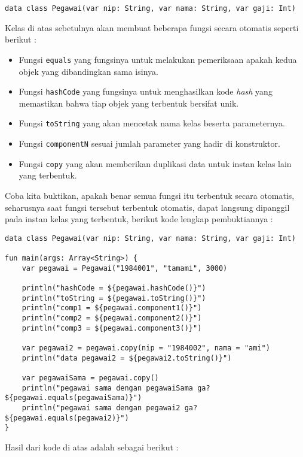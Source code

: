 \begin{lstlisting}
data class Pegawai(var nip: String, var nama: String, var gaji: Int)
\end{lstlisting}

Kelas di atas sebetulnya akan membuat beberapa fungsi secara otomatis seperti berikut :

\begin{itemize}
	\item Fungsi \texttt{equals} yang fungsinya untuk melakukan pemeriksaan apakah kedua objek yang dibandingkan sama isinya.
	\item Fungsi \texttt{hashCode} yang fungsinya untuk menghasilkan kode \textit{hash} yang memastikan bahwa tiap objek yang terbentuk bersifat unik.
	\item Fungsi \texttt{toString} yang akan mencetak nama kelas beserta parameternya.
	\item Fungsi \texttt{componentN} sesuai jumlah parameter yang hadir di konstruktor.
	\item Fungsi \texttt{copy} yang akan memberikan duplikasi data untuk instan kelas lain yang terbentuk.
\end{itemize}

Coba kita buktikan, apakah benar semua fungsi itu terbentuk secara otomatis, seharusnya saat fungsi tersebut terbentuk otomatis, dapat langsung dipanggil pada instan kelas yang terbentuk, berikut kode lengkap pembuktiannya :

\begin{lstlisting}
data class Pegawai(var nip: String, var nama: String, var gaji: Int) 

fun main(args: Array<String>) {
	var pegawai = Pegawai("1984001", "tamami", 3000)
	
	println("hashCode = ${pegawai.hashCode()}")
	println("toString = ${pegawai.toString()}")
	println("comp1 = ${pegawai.component1()}")
	println("comp2 = ${pegawai.component2()}")
	println("comp3 = ${pegawai.component3()}")
	
	var pegawai2 = pegawai.copy(nip = "1984002", nama = "ami")
	println("data pegawai2 = ${pegawai2.toString()}")
	
	var pegawaiSama = pegawai.copy()
	println("pegawai sama dengan pegawaiSama ga? ${pegawai.equals(pegawaiSama)}")
	println("pegawai sama dengan pegawai2 ga? ${pegawai.equals(pegawai2)}")
}
\end{lstlisting}

Hasil dari kode di atas adalah sebagai berikut :

